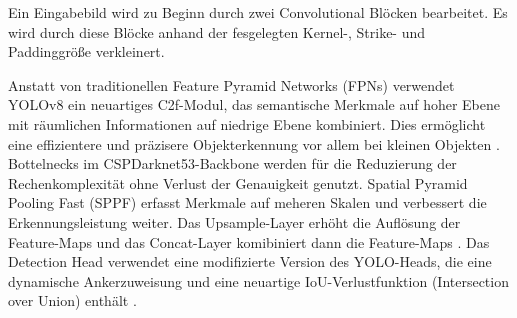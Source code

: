 \documentclass[a4paper,12pt]{article}
\begin{document}
\noindent Ein Eingabebild wird zu Beginn durch zwei Convolutional Blöcken bearbeitet. Es wird durch diese Blöcke anhand der fesgelegten Kernel-, Strike- und Paddinggröße verkleinert. %

\noindent Anstatt von traditionellen Feature Pyramid Networks (FPNs) verwendet YOLOv8 ein neuartiges C2f-Modul, das semantische Merkmale auf hoher Ebene mit räumlichen Informationen auf niedrige Ebene kombiniert. Dies ermöglicht eine effizientere und präzisere Objekterkennung vor allem bei kleinen Objekten \cite{yolov8_architecture}.
\noindent Bottelnecks im CSPDarknet53-Backbone werden für die Reduzierung der Rechenkomplexität ohne Verlust der Genauigkeit genutzt.
\noindent Spatial Pyramid Pooling Fast (SPPF) erfasst Merkmale auf meheren Skalen und verbessert die Erkennungsleistung weiter.
\noindent Das Upsample-Layer erhöht die Auflösung der Feature-Maps und das Concat-Layer komibiniert dann die Feature-Maps \cite{terven2023comprehensive}.
\noindent Das Detection Head verwendet eine modifizierte Version des YOLO-Heads, die eine dynamische Ankerzuweisung und eine neuartige IoU-Verlustfunktion (Intersection over Union) enthält \cite{yolov8_architecture}. %


\FloatBarrier

\printbibliography
\end{document}
